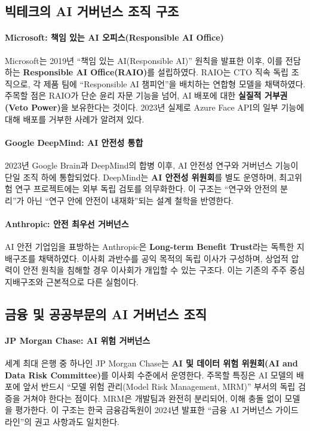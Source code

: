 \subsection{빅테크의 AI 거버넌스 조직 구조}
\label{sec:4.4.1}

\paragraph{Microsoft: 책임 있는 AI 오피스(Responsible AI Office)}
Microsoft는 2019년 ``책임 있는 AI(Responsible AI)'' 원칙을 발표한 이후, 이를 전담하는 \textbf{Responsible AI Office(RAIO)}를 설립하였다. RAIO는 CTO 직속 독립 조직으로, 각 제품 팀에 ``Responsible AI 챔피언''을 배치하는 연합형 모델을 채택하였다. 주목할 점은 RAIO가 단순 윤리 자문 기능을 넘어, AI 배포에 대한 \textbf{실질적 거부권(Veto Power)}을 보유한다는 것이다. 2023년 실제로 Azure Face API의 일부 기능에 대해 배포를 거부한 사례가 알려져 있다.

\paragraph{Google DeepMind: AI 안전성 통합}
2023년 Google Brain과 DeepMind의 합병 이후, AI 안전성 연구와 거버넌스 기능이 단일 조직 하에 통합되었다. DeepMind는 \textbf{AI 안전성 위원회}를 별도 운영하며, 최고위험 연구 프로젝트에는 외부 독립 검토를 의무화한다. 이 구조는 ``연구와 안전의 분리''가 아닌 ``연구 안에 안전이 내재화''되는 설계 철학을 반영한다.

\paragraph{Anthropic: 안전 최우선 거버넌스}
AI 안전 기업임을 표방하는 Anthropic은 \textbf{Long-term Benefit Trust}라는 독특한 지배구조를 채택하였다. 이사회 과반수를 공익 목적의 독립 이사가 구성하며, 상업적 압력이 안전 원칙을 침해할 경우 이사회가 개입할 수 있는 구조다. 이는 기존의 주주 중심 지배구조와 근본적으로 다른 실험이다.

\subsection{금융 및 공공부문의 AI 거버넌스 조직}
\label{sec:4.4.2}

\paragraph{JP Morgan Chase: AI 위험 거버넌스}
세계 최대 은행 중 하나인 JP Morgan Chase는 \textbf{AI 및 데이터 위험 위원회(AI and Data Risk Committee)}를 이사회 수준에서 운영한다. 주목할 특징은 AI 모델의 배포에 앞서 반드시 ``모델 위험 관리(Model Risk Management, MRM)'' 부서의 독립 검증을 거쳐야 한다는 점이다. MRM은 개발팀과 완전히 분리되어, 이해 충돌 없이 모델을 평가한다. 이 구조는 한국 금융감독원이 2024년 발표한 ``금융 AI 거버넌스 가이드라인''의 권고 사항과도 일치한다.

